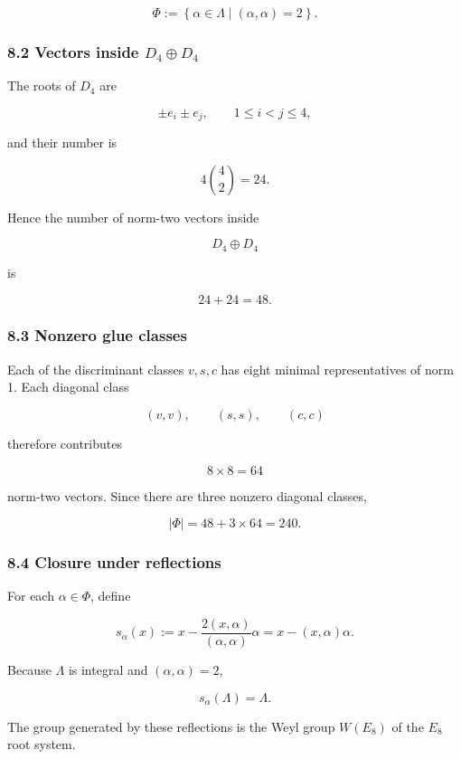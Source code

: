 \documentclass[
  a4paper,
]{article}
\begin{document}
\[
\Phi
:=
\left\{
\alpha\in\Lambda
\mid
(\alpha,\alpha)=2
\right\}.
\]

\subsubsection{\texorpdfstring{8.2 Vectors inside
\(D_4\oplus D_4\)}{8.2 Vectors inside D\_4\textbackslash oplus D\_4}}\label{vectors-inside-d_4oplus-d_4}

The roots of \(D_4\) are

\[
\pm e_i\pm e_j,
\qquad
1\le i<j\le4,
\]

and their number is

\[
4\binom42
=24.
\]

Hence the number of norm-two vectors inside

\[
D_4\oplus D_4
\]

is

\[
24+24=48.
\]

\subsubsection{8.3 Nonzero glue classes}\label{nonzero-glue-classes}

Each of the discriminant classes \(v,s,c\) has eight minimal
representatives of norm 1. Each diagonal class

\[
(v,v),\qquad(s,s),\qquad(c,c)
\]

therefore contributes

\[
8\times8=64
\]

norm-two vectors. Since there are three nonzero diagonal classes,

\[
\boxed{
|\Phi|
=
48+3\times64
=240.
}
\]

\subsubsection{8.4 Closure under
reflections}\label{closure-under-reflections}

For each \(\alpha\in\Phi\), define

\[
s_\alpha(x)
:=
x
-\frac{2(x,\alpha)}
{(\alpha,\alpha)}
\alpha
=
x-(x,\alpha)\alpha.
\]

Because \(\Lambda\) is integral and \((\alpha,\alpha)=2\),

\[
s_\alpha(\Lambda)
=
\Lambda.
\]

The group generated by these reflections is the Weyl group \(W(E_8)\) of
the \(E_8\) root system.
\end{document}
